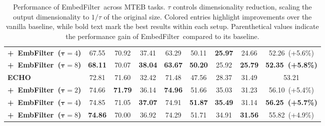 \documentclass{llmxive}
\providecommand{\name}{EmbedFilter}
\begin{document}
\begin{table}[t]
{\begin{tabular}{lcccccccc}
            \quad \textbf{\textrm{+~EmbFilter~(\(\mathbf{\tau}=4\))}} & \cellcolor{DodgerBlue!15} 67.55 & 70.92 & \cellcolor{DodgerBlue!15} 37.41 & \cellcolor{DodgerBlue!15} 63.29 & \cellcolor{DodgerBlue!15} 50.11 & \cellcolor{DodgerBlue!15} \textbf{25.97} & 24.66 & \cellcolor{DodgerBlue!15} 52.26~(+5.6\%) \\
            \quad \textbf{\textrm{+~EmbFilter~(\(\mathbf{\tau}=8\))}} & \cellcolor{DodgerBlue!15} \textbf{68.11} & 70.07 & \cellcolor{DodgerBlue!15} \textbf{38.04} & \cellcolor{DodgerBlue!15} \textbf{63.67} & \cellcolor{DodgerBlue!15} \textbf{50.20} & \cellcolor{DodgerBlue!15} 25.92 & \cellcolor{DodgerBlue!15} \textbf{25.79} &  \cellcolor{DodgerBlue!15} \textbf{52.35~(+5.8\%) }\\
            \cmidrule(l{4pt}r{4pt}){1-9}
            \textbf{\textrm{ECHO}}  & 72.81 & 71.60 & 32.42 & 71.48 & 47.56 & 28.37 & 31.49 & 53.21 \\
            \cmidrule(l{1pt}r{1pt}){1-9}
            \quad \textbf{\textrm{+~EmbFilter~(\(\mathbf{\tau}=2\))}} & \cellcolor{DodgerBlue!15} 74.66 & \cellcolor{DodgerBlue!15} \textbf{71.79} & \cellcolor{DodgerBlue!15} 36.14 & \cellcolor{DodgerBlue!15} \textbf{74.96} & \cellcolor{DodgerBlue!15} 51.66 & \cellcolor{DodgerBlue!15} 35.03 & 31.23 & \cellcolor{DodgerBlue!15} 56.10~(+5.4\%) \\
            \quad \textbf{\textrm{+~EmbFilter~(\(\mathbf{\tau}=4\))}}  & \cellcolor{DodgerBlue!15} 74.85 & 71.05 & \cellcolor{DodgerBlue!15} \textbf{37.07} & \cellcolor{DodgerBlue!15} 74.91 & \cellcolor{DodgerBlue!15} \textbf{51.87} & \cellcolor{DodgerBlue!15} \textbf{35.49} & 31.14 & \cellcolor{DodgerBlue!15} \textbf{56.25~(+5.7\%) }\\
            \quad \textbf{\textrm{+~EmbFilter~(\(\mathbf{\tau}=8\))}} & \cellcolor{DodgerBlue!15} \textbf{74.86} & 70.00 & \cellcolor{DodgerBlue!15} 36.92 & \cellcolor{DodgerBlue!15} 74.29 & \cellcolor{DodgerBlue!15} 51.71 & \cellcolor{DodgerBlue!15} 34.91 & \cellcolor{DodgerBlue!15} \textbf{31.56} & \cellcolor{DodgerBlue!15} 55.82~(+4.9\%) \\

            \bottomrule
        \end{tabular}
    }
\caption{
    Performance of \name\ across MTEB tasks. 
    \(\tau\) controls dimensionality reduction, scaling the output dimensionality to \(1/\tau\) of the original size.
    Colored entries highlight improvements over the vanilla baseline, while bold text mark the best results within each setup.
    Parenthetical values indicate the performance gain of \name~compared to its baseline.
    }
\end{table}
\end{document}
